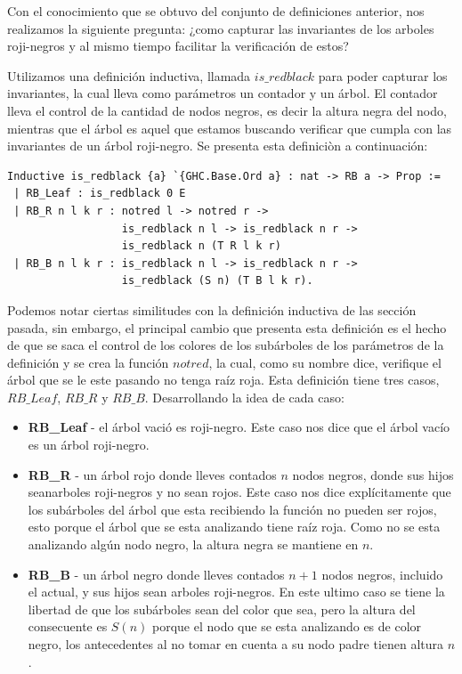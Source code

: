 \documentclass[8pt,leqno,pdflatex,spanish]{book}
\newcommand{\arn}{árbol roji-negro}
\newcommand{\arns}{arboles roji-negros}
\theoremstyle{plain}
\theoremstyle{definition}
\theoremstyle{remark}
\begin{document}
Con el conocimiento que se obtuvo del conjunto de definiciones anterior, nos realizamos la 
siguiente pregunta: ¿como capturar las invariantes de los {\arns} y al mismo tiempo facilitar la 
verificaci\'on de estos?

Utilizamos una definición inductiva, llamada $is\_redblack$ para poder capturar los invariantes, 
la cual lleva como parámetros un contador y un \'arbol. El contador lleva el control de la 
cantidad de nodos negros, es decir la altura negra del nodo, mientras que el \'arbol es aquel que 
estamos buscando verificar que cumpla con las invariantes de un {\arn}. Se presenta esta definici\`
on a continuaci\'on:

\begin{verbatim}
Inductive is_redblack {a} `{GHC.Base.Ord a} : nat -> RB a -> Prop :=
 | RB_Leaf : is_redblack 0 E
 | RB_R n l k r : notred l -> notred r ->
                  is_redblack n l -> is_redblack n r ->
                  is_redblack n (T R l k r)
 | RB_B n l k r : is_redblack n l -> is_redblack n r ->
                  is_redblack (S n) (T B l k r).
\end{verbatim}

Podemos notar ciertas similitudes con la definición inductiva de las secci\'on pasada, sin 
embargo, el 
principal cambio que presenta esta definición es el hecho de que se saca el control de los colores 
de los subárboles de los parámetros de la definici\'on y se crea la funci\'on $notred$, la cual,
como su nombre dice, verifique el \'arbol que se le este pasando no tenga raíz roja. Esta 
definici\'on tiene tres casos,$RB\_Leaf$, $RB\_R$ y $RB\_B$. Desarrollando la idea de cada caso:

\begin{itemize}
        \item \textbf{RB\_Leaf} - el árbol vació es roji-negro. Este caso nos dice que el \'arbol 
        vacío es un {\arn}.
        \item \textbf{RB\_R} - un árbol rojo donde lleves contados $n$ nodos negros, donde sus 
        hijos sean{\arns} y no sean rojos. Este caso nos dice explícitamente que los subárboles 
        del árbol que esta recibiendo la función no pueden ser rojos, esto porque el árbol que se 
        esta analizando tiene raíz roja. Como no se esta analizando algún nodo negro, la altura 
        negra se mantiene en $n$.
        \item \textbf{RB\_B} - un árbol negro donde lleves contados $n+1$ nodos negros, incluido 
        el actual, y sus hijos sean {\arns}. En este ultimo caso se tiene la libertad de que los 
        subárboles sean del color que sea, pero la altura del consecuente es $S(n)$ porque el nodo 
        que se esta analizando es de color negro, los antecedentes al no tomar en cuenta a su nodo 
        padre tienen altura $n$.
\end{itemize}
\end{document}
